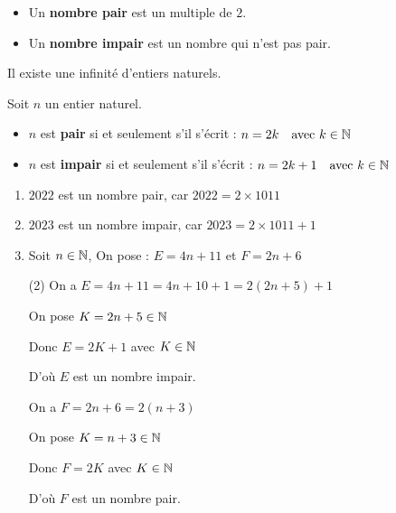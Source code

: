 \documentclass[10pt, a4paper]{article}
\begin{document}
\begin{Definition}[]
\begin{itemize}[leftmargin=*,itemsep=0.5pt]
  \item Un \textbf{nombre pair} est un multiple de $2$.
  \item Un \textbf{nombre impair} est un nombre qui n'est pas pair.
\end{itemize}
\end{Definition}



\begin{Remarque}
   Il existe une infinité d'entiers naturels.
\end{Remarque}

\begin{Propriete} Soit $n$ un entier naturel.
\begin{itemize}[leftmargin=*,itemsep=0.5pt]
    \item $n$ est \textbf{pair} si et seulement s'il s'écrit :
$n = 2k \quad \text{avec } k \in \mathbb{N}$

    \item $n$ est \textbf{impair} si et seulement s'il s'écrit :
$n = 2k + 1 \quad \text{avec } k \in \mathbb{N}$
\end{itemize}
\end{Propriete}

\begin{Exemple}[][5 min]
\begin{enumerate}[leftmargin=*,itemsep=0.5pt]
    \item $2022$ est un nombre pair, car $2022 = 2 \times 1011$
    \item $2023$ est un nombre impair, car $2023 = 2 \times 1011 + 1$
    \item Soit $n \in \mathbb{N}$,
    On pose : $E = 4n + 11$ et $F = 2n + 6$
\begin{tasks}[label=$\bullet$, label-width=8pt, item-indent=15pt](2)
    \task On a $E = 4n + 11 = 4n + 10 + 1 = 2(2n + 5) + 1$

On pose $K = 2n + 5 \in \mathbb{N}$

Donc $E = 2K + 1$ avec $K \in \mathbb{N}$

 D'où $E$ est un nombre impair.

    \task On a $F = 2n + 6 = 2(n + 3)$

    On pose $K = n + 3 \in \mathbb{N}$

    Donc $F = 2K$ avec $K \in \mathbb{N}$

    D'où $F$ est un nombre pair.
\end{tasks}
\end{enumerate}
\end{Exemple}
\end{document}
